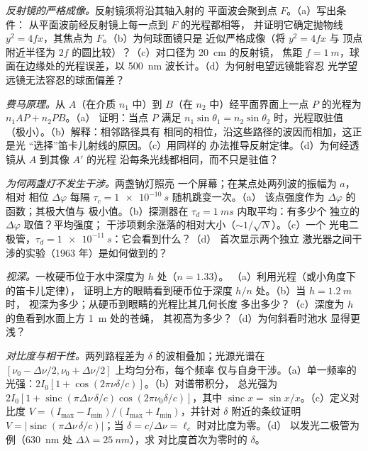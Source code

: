 \begin{exercise}[$\star\star$]\label{exo:b2:scalar-light-model:6}
\emph{反射镜的严格成像。}反射镜须将沿其轴入射的
平面波会聚到点 $F$。（a）写出条件：
从平面波前经反射镜上每一点到 $F$ 的光程都相等，
并证明它确定抛物线 $y^2 = 4fx$，其焦点为 $F$。（b）为何球面镜只是
近似严格成像（将 $y^2 = 4fx$ 与
顶点附近半径为 $2f$ 的圆比较）？（c）对口径为 \qty{20}{cm} 的反射镜，
焦距 $f = \qty{1}{m}$，球面在边缘处的光程误差，以
\qty{500}{nm} 波长计。（d）为何射电望远镜能容忍
光学望远镜无法容忍的球面偏差？
\end{exercise}

\begin{exercise}[$\star\star$]\label{exo:b2:scalar-light-model:7}
\emph{费马原理。}从 $A$（在介质 $n_1$ 中）到 $B$（在
$n_2$ 中）经平面界面上一点 $P$ 的光程为 $n_1AP + n_2PB$。（a）
证明：当点 $P$ 满足
$n_1\sin\theta_1 = n_2\sin\theta_2$ 时，光程取驻值（极小）。（b）解释：相邻路径具有
相同的相位，沿这些路径的波因而相加，这正是光
“选择”笛卡儿射线的原因。（c）用同样的
办法推导反射定律。（d）为何经透镜从 $A$ 到其像 $A'$ 的光程
沿每条光线都相同，而不只是驻值？
\end{exercise}

\begin{exercise}[$\star\star$]\label{exo:b2:scalar-light-model:8}
\emph{为何两盏灯不发生干涉。}两盏钠灯照亮
一个屏幕；在某点处两列波的振幅为 $a$，相对
相位 $\Delta\varphi$ 每隔 $\tau_c = \qty{1e-10}{s}$ 随机跳变一次。（a）
该点强度作为 $\Delta\varphi$ 的函数；其极大值与
极小值。（b）探测器在 $\tau_d = \qty{1}{ms}$ 内取平均：有多少个
独立的 $\Delta\varphi$ 取值？平均强度；
干涉项剩余涨落的相对大小（$\sim 1/\sqrt N$）。（c）一个
光电二极管，$\tau_d = \qty{1e-11}{s}$：它会看到什么？（d）
首次显示两个独立
激光器之间干涉的实验（1963 年）是如何做到的？
\end{exercise}

\begin{exercise}[$\star\star$]\label{exo:b2:scalar-light-model:9}
\emph{视深。}一枚硬币位于水中深度为 $h$ 处（$n = 1.33$）。
（a）利用光程（或小角度下的笛卡儿定律），
证明上方的眼睛看到硬币位于深度 $h/n$ 处。（b）当 $h = \qty{1.2}{m}$ 时，
视深为多少；从硬币到眼睛的光程比其几何长度
多出多少？（c）深度为 $h$ 的鱼看到水面上方 \qty{1}{m} 处的苍蝇，
其视高为多少？（d）为何斜看时池水
显得更浅？
\end{exercise}

\begin{exercise}[$\star\star\star$]\label{exo:b2:scalar-light-model:10}
\emph{对比度与相干性。}两列路程差为
$\delta$ 的波相叠加；光源光谱在
$[\nu_0 - \Delta\nu/2, \nu_0 + \Delta\nu/2]$ 上均匀分布，每个频率
仅与自身干涉。（a）单一频率的光强：$2I_0
[1 + \cos(2\pi\nu\delta/c)]$。（b）对谱带积分，
总光强为 $2I_0[1 + \operatorname{sinc}(\pi\Delta\nu\,\delta/c)\cos(2\pi\nu_0\delta/c)]$，其中
$\operatorname{sinc}x = \sin x/x$。（c）定义对比度 $V = (I_{\max} -
I_{\min})/(I_{\max} + I_{\min})$，并针对 $\delta$ 附近的条纹证明 $V =
|\operatorname{sinc}(\pi\Delta\nu\,\delta/c)|$；当 $\delta = c/\Delta\nu = \ell_c$ 时对比度为零。（d）
以发光二极管为例（\qty{630}{nm} 处 $\Delta\lambda = \qty{25}{nm}$），求
对比度首次为零时的 $\delta$。
\end{exercise}

